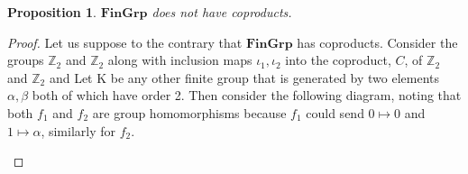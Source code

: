 \documentclass{article}
\newcommand{\Z}{\mathbb{Z}}
\newtheorem{proposition}[subsection]{Proposition}
\begin{document}
\begin{proposition}
$\mathbf{FinGrp}$ does not have coproducts.
\end{proposition}
\begin{proof}
Let us suppose to the contrary that $\mathbf{FinGrp}$ has coproducts. Consider the groups $\Z_{2}$ and $\Z_{2}$ along with inclusion maps $\iota_{1},\iota_{2}$ into the coproduct, $C$, of $\Z_{2}$ and $\Z_{2}$ and Let K be any other finite group that is generated by two elements $\alpha, \beta$ both of which have order 2. Then consider the following diagram, noting that both $f_{1}$ and $f_{2}$ are group homomorphisms because $f_{1}$ could send $0\mapsto 0$ and $1\mapsto \alpha$, similarly for $f_{2}$.
\begin{center}
\end{center}


\end{proof}
\end{document}
